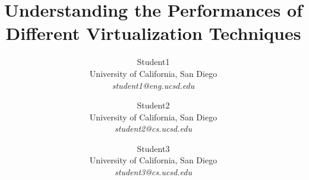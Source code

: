 \documentclass[letterpaper,twocolumn,10pt]{article}
\begin{document}

\title{\bf Understanding the Performances of Different Virtualization Techniques}
\author{
  {\rm Student1}\\
  University of California, San Diego\\
  \textit{student1@eng.ucsd.edu}
  \and
  {\rm Student2}\\
  University of California, San Diego\\
  \textit{student2@cs.ucsd.edu}
  \and
  {\rm Student3}\\
  University of California, San Diego\\
  \textit{student3@cs.ucsd.edu}
} %

\maketitle






% 



% 
% 

{\normalsize 
}

\end{document}
